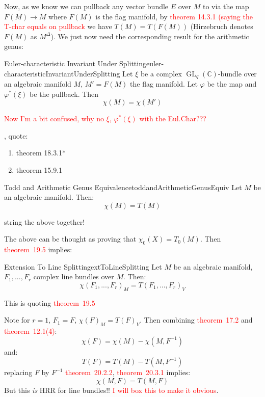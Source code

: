 \documentclass{book}
\newcommand{\C}{{\mathbb{C}}}
\newcommand{\GL}{{\operatorname{GL}}}
\let\temp\phi
\let\phi\varphi
\let\varphi\temp
\begin{document}
Now, as we know we can pullback any vector bundle $E$ over $M$ to via the map $F(M) \to M$ where $F(M)$ is the
flag manifold, by \textcolor{red}{theorem 14.3.1 (saying the T-char equals on pullback} we have $T(M)
=T(F(M))$ (Hirzebruch denotes $F(M)$ as $M^\Delta$). We just now need the corresponding result for the
arithmetic genus:

\begin{thm}{Euler-characteristic Invariant Under Splitting}{euler-characteristicInvariantUnderSplitting}
  Let $\xi$ be a complex $\GL_q(\C)$-bundle over an algebraic manifold $M$, $M' = F(M)$ the flag manifold. Let
  $\phi$ be the map and $\phi^*(\xi)$ be the pullback. Then
  \[
    \chi(M) = \chi(M')
  \]
\end{thm}

\textcolor{red}{Now I'm a bit confused, why no $\xi$, $\phi^*(\xi)$ with the Eul.Char???}

\begin{Proof}
  \cite[p.149]{hirzebruchTopologicalMethodsAlgebraic1995}, quote:
  \begin{enumerate}
    \item theorem 18.3.1*
    \item theorem 15.9.1
  \end{enumerate}
\end{Proof}

\begin{thm}{Todd and Arithmetic Genus Equivalence}{toddandArithmeticGenusEquiv}
  Let $M$ be an algebraic manifold. Then:
  \[
    \chi(M) = T(M)
  \]
\end{thm}

\begin{Proof}
  string the above together!
\end{Proof}

The above can be thought as proving that $\chi_0(X) = T_0(M)$. Then \textcolor{red}{theorem~19.5} implies:

\begin{thm}{Extension To Line Splitting}{extToLineSplitting}
  Let $M$ be an algebraic manifold, $F_1,..., F_r$ complex line bundles over $M$. Then:
  \[
    \chi(F_1, ..., F_r)_M = T(F_1, ..., F_r)_V
  \]
\end{thm}


\begin{Proof}
  This is quoting \textcolor{red}{theorem~19.5}
\end{Proof}

Note for $r = 1$, $F_1 = F$, $\chi(F)_M = T(F)_V$. Then combining \textcolor{red}{theorem~17.2} and
\textcolor{red}{theorem~12.1(4)}:
\[
  \chi(F) = \chi(M) - \chi(M,F^{-1})
\]
and:
\[
  T(F) = T(M) - T(M,F^{-1})
\]
replacing $F$ by $F^{-1}$ \textcolor{red}{theorem~20.2.2}, \textcolor{red}{theorem~20.3.1} implies:
\[
  \chi(M,F) = T(M,F)
\]
But this \emph{is} HRR for line bundles!! \textcolor{red}{I will box this to make it obvious}.
\end{document}
